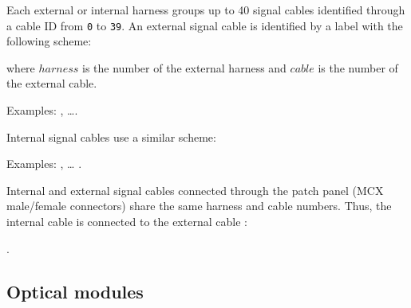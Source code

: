 \vskip 10pt Each  external or internal harness groups up  to 40 signal
cables identified through  a cable ID from  \texttt{0} to \texttt{39}.
An external signal  cable is identified by a label  with the following
scheme:
\begin{center}
 \end{center}
where \texttt{$harness$}  is the  number of  the external  harness and
\texttt{$cable$} is  the number of the  external cable.  \par\noindent
Examples: , \dots {}.

\vskip 10pt Internal signal cables use a similar scheme:
\begin{center}
\end{center}
\par\noindent Examples: , \dots
{}.

Internal and external signal cables  connected through the patch panel
(MCX male/female connectors) share the same harness and cable numbers.
Thus, the  internal cable   is connected  to the
external cable :
\begin{center}
.
\end{center}


\subsection{Optical modules}



